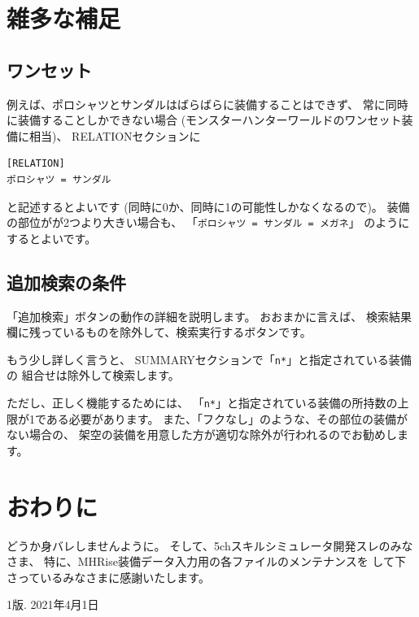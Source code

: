 \documentclass[dvipdfmx]{jsarticle}
\begin{document}
\section{雑多な補足} %

\subsection{ワンセット}
例えば、ポロシャツとサンダルはばらばらに装備することはできず、
常に同時に装備することしかできない場合
(モンスターハンターワールドのワンセット装備に相当)、
RELATIONセクションに
\medskip

{\footnotesize\begin{mdframed}\begin{Verbatim}[commandchars=!<>]
[RELATION]
ポロシャツ = サンダル
\end{Verbatim}
\end{mdframed}}
\medskip

と記述するとよいです (同時に0か、同時に1の可能性しかなくなるので)。
装備の部位がが2つより大きい場合も、
「\texttt{ポロシャツ = サンダル = メガネ}」
のようにするとよいです。

\subsection{追加検索の条件}
「追加検索」ボタンの動作の詳細を説明します。
おおまかに言えば、
検索結果欄に残っているものを除外して、検索実行するボタンです。

もう少し詳しく言うと、
SUMMARYセクションで「\texttt{n*}」と指定されている装備の
組合せは除外して検索します。

ただし、正しく機能するためには、
「\texttt{n*}」と指定されている装備の所持数の上限が1である必要があります。
また、「フクなし」のような、その部位の装備がない場合の、
架空の装備を用意した方が適切な除外が行われるのでお勧めします。

\section{おわりに} %
どうか身バレしませんように。
そして、5chスキルシミュレータ開発スレのみなさま、
特に、MHRise装備データ入力用の各ファイルのメンテナンスを
して下さっているみなさまに感謝いたします。

\bigskip

\noindent
1版. 2021年4月1日
\end{document}
